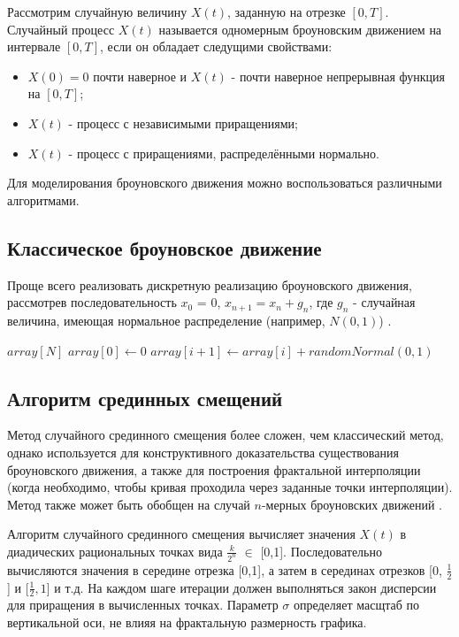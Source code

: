 Рассмотрим случайную величину $X(t)$, заданную на отрезке $[0,T]$. Случайный процесс  $X(t)$ называется одномерным броуновским движением на интервале $[0,T]$, если он обладает следущими свойствами:
\begin{itemize} 
	\item $X(0) = 0$ почти наверное и $X(t)$ - почти наверное непрерывная функция на $[0,T]$;
	\item $X(t)$ - процесс с независимыми приращениями;
	\item  $X(t)$ -  процесс с приращениями, распределёнными нормально.
\end{itemize}

Для моделирования броуновского движения можно воспользоваться различными алгоритмами.

\subsection{Классическое броуновское движение}

Проще всего реализовать дискретную реализацию броуновского движения, рассмотрев последовательность $x_0$ = 0, $x_{n+1} = x_n + g_n$, где $g_n$ - случайная величина, имеющая нормальное распределение (например, $N(0,1)$) \cite{maxima}.

\begin{algorithmic}[1]
	\State $array[N]$
	\State $array[0]\gets 0$
	\State $array[i+1]\gets array[i] + randomNormal(0,1)$
	\EndFor
\end{algorithmic}

\subsection{Алгоритм срединных смещений}

Метод случайного срединного смещения более сложен, чем классический метод, однако используется для конструктивного доказательства существования броуновского движения, а также для построения фрактальной интерполяции (когда необходимо, чтобы кривая проходила через заданные точки интерполяции). Метод также может быть обобщен на случай $n$-мерных броуновских движений \cite{maxima}.

Алгоритм случайного срединного смещения вычисляет значения $X(t)$ в диадических рациональных точках вида $\frac{k}{2^n}$ $\in$ [0,1]. Последовательно вычисляются значения в середине отрезка [0,1], а затем в серединах отрезков [0, $\frac{1}{2}$] и [$\frac{1}{2}, 1$] и т.д. На каждом шаге итерации должен выполняться закон дисперсии для приращения в вычисленных точках. Параметр $\sigma$ определяет масщтаб по вертикальной оси, не влияя на фрактальную размерность графика. 

